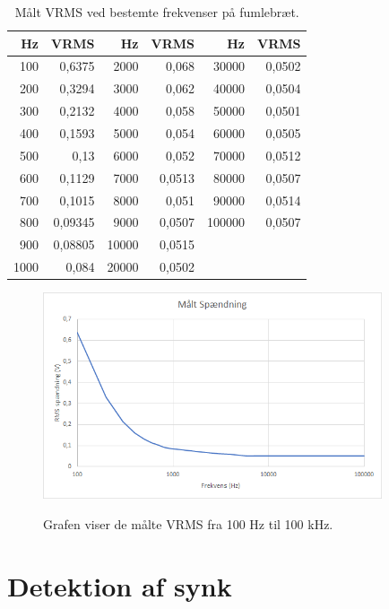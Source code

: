 \begin{table}[H]
\centering
\begin{tabular}{| r | r || r | r || r | r |}
    \hline
    \textbf{Hz} & \textbf{VRMS} & \textbf{Hz} & \textbf{VRMS} & \textbf{Hz} & \textbf{VRMS}\\ \hline
    100 & 0,6375 & 2000 & 0,068 & 30000 & 0,0502 \\ \hline
    200 & 0,3294 & 3000 & 0,062 & 40000 & 0,0504   \\ \hline
    300 & 0,2132 & 4000 & 0,058 & 50000 & 0,0501   \\ \hline
    400 & 0,1593 & 5000 & 0,054 & 60000 & 0,0505   \\ \hline
    500 & 0,13 & 6000 & 0,052 & 70000 & 0,0512  \\ \hline
    600 & 0,1129 & 7000 & 0,0513 & 80000 & 0,0507   \\ \hline
    700 & 0,1015 & 8000 & 0,051 & 90000 & 0,0514  \\ \hline
    800 & 0,09345 & 9000 & 0,0507 & 100000 & 0,0507   \\ \hline
    900 & 0,08805 & 10000 & 0,0515 &  &     \\ \hline
    1000 & 0,084 & 20000 & 0,0502 & &   \\ \hline
\end{tabular}
    \caption{Målt VRMS ved bestemte frekvenser på fumlebræt.}
    \label{table:fumlebraetfrekvenservrms}
\end{table} 


\begin{figure}[H]
\centering
{\includegraphics[width=10cm]
{Figure/testopstilling1fumlevrmsgraf}}
\caption{Grafen viser de målte VRMS fra 100 Hz til 100 kHz.}
\label{fig:testopstilling1fumlevrmsgraf}
\end{figure}

\section{Detektion af synk}

